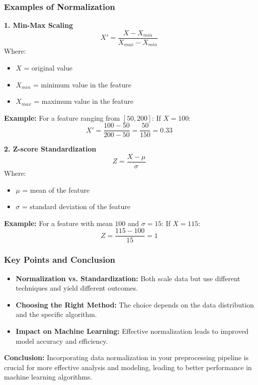 \documentclass[aspectratio=169]{beamer}
\begin{document}
\begin{frame}[fragile]
    \frametitle{Examples of Normalization}
    
    \textbf{1. Min-Max Scaling}
    \begin{equation} 
    X' = \frac{X - X_{min}}{X_{max} - X_{min}} 
    \end{equation}
    Where:
    \begin{itemize}
        \item \(X\) = original value
        \item \(X_{min}\) = minimum value in the feature
        \item \(X_{max}\) = maximum value in the feature
    \end{itemize}
    
    \textbf{Example:} For a feature ranging from \([50, 200]\):
    If \(X = 100\):
    \begin{equation} 
    X' = \frac{100 - 50}{200 - 50} = \frac{50}{150} = 0.33 
    \end{equation}
    
    \textbf{2. Z-score Standardization}
    \begin{equation} 
    Z = \frac{X - \mu}{\sigma} 
    \end{equation}
    Where:
    \begin{itemize}
        \item \(\mu\) = mean of the feature
        \item \(\sigma\) = standard deviation of the feature
    \end{itemize}
    
    \textbf{Example:} For a feature with mean \(100\) and \( \sigma = 15\):
    If \(X = 115\):
    \begin{equation} 
    Z = \frac{115 - 100}{15} = 1 
    \end{equation}
\end{frame}

\begin{frame}[fragile]
    \frametitle{Key Points and Conclusion}
    \begin{itemize}
        \item \textbf{Normalization vs. Standardization:} Both scale data but use different techniques and yield different outcomes.
        
        \item \textbf{Choosing the Right Method:} The choice depends on the data distribution and the specific algorithm.
        
        \item \textbf{Impact on Machine Learning:} Effective normalization leads to improved model accuracy and efficiency.
    \end{itemize}
    
    \textbf{Conclusion:} Incorporating data normalization in your preprocessing pipeline is crucial for more effective analysis and modeling, leading to better performance in machine learning algorithms.
\end{frame}
\end{document}
